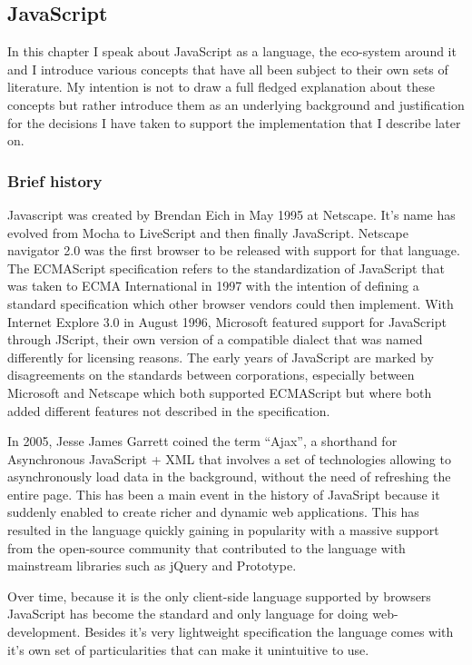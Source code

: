 \subsection{JavaScript}

In this chapter I speak about JavaScript as a language, the eco-system around it and I introduce various concepts that have all been subject to their own sets of literature. My intention is not to draw a full fledged explanation about these concepts but rather introduce them as an underlying background and justification for the decisions I have taken to support the implementation that I describe later on.

\subsubsection{Brief history}

Javascript was created by Brendan Eich in May 1995 at Netscape. It's name has evolved from Mocha to LiveScript and then finally JavaScript. Netscape navigator 2.0 was the first browser to be released with support for that language. The ECMAScript specification refers to the standardization of JavaScript that was taken to ECMA International in 1997 with the intention of defining a standard specification which other browser vendors could then implement. With Internet Explore 3.0 in August 1996, Microsoft featured support for JavaScript through JScript, their own version of a compatible dialect that was named differently for licensing reasons. The early years of JavaScript are marked by disagreements on the standards between corporations, especially between Microsoft and Netscape which both supported ECMAScript but where both added different features not described in the specification.

In 2005, Jesse James Garrett coined the term ``Ajax''\cite{Garrett2005}, a shorthand for Asynchronous JavaScript + XML that involves a set of technologies allowing to asynchronously load data in the background, without the need of refreshing the entire page. This has been a main event in the history of JavaSript because it suddenly enabled to create richer and dynamic web applications. This has resulted in the language quickly gaining in popularity with a massive support from the open-source community that contributed to the language with mainstream libraries such as jQuery and Prototype.

Over time, because it is the only client-side language supported by browsers JavaScript has become the standard and only language for doing web-development. Besides it's very lightweight specification the language comes with it's own set of particularities that can make it unintuitive to use.


